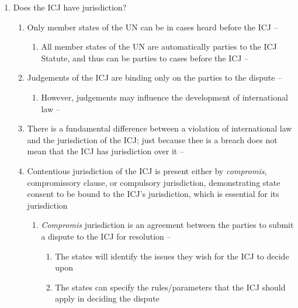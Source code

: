 \begin{enumerate}
\begin{enumerate}
\begin{itemize}
\begin{enumerate}
            \end{enumerate}
        \end{itemize}
    \end{enumerate}
    \item Does the ICJ have jurisdiction?
    \begin{enumerate}
        \item Only member states of the UN can be in cases heard before the ICJ -- 
        \begin{enumerate}
            \item All member states of the UN are automatically parties to the ICJ Statute, and thus can be parties to cases before the ICJ -- 
        \end{enumerate}
        \item Judgements of the ICJ are binding only on the parties to the dispute -- 
        \begin{enumerate}
            \item However, judgements may influence the development of international law -- 
        \end{enumerate}
        \item There is a fundamental difference between a violation of international law and the jurisdiction of the ICJ; just because thee is a breach does not mean that the ICJ has jurisdiction over it -- 
        \item Contentious jurisdiction of the ICJ is present either by \textit{compromis}, compromissory clause, or compulsory jurisdiction, demonstrating state consent to be bound to the ICJ's jurisdiction, which is essential for its jurisdiction
        \begin{enumerate}
            \item \textit{Compromis} jurisdiction is an agreement between the parties to submit a dispute to the ICJ for resolution -- 
            \begin{enumerate}
                \item The states will identify the issues they wish for the ICJ to decide upon
                \item The states can specify the rules/parameters that the ICJ should apply in deciding the dispute
            \end{enumerate}

\end{enumerate}
\end{enumerate}
\end{enumerate}
